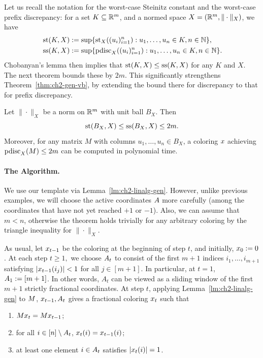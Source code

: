 Let us recall the notation for the worst-case Steinitz constant
and the worst-case prefix discrepancy: for a set \(K
\subseteq \mathbb{R}^m\), and a normed space \(X = (\mathbb{R}^m,\|\cdot\|_X)\), we  have
\begin{align*}
  &\operatorname{st}(K, X) := \sup\{\operatorname{st}_X((u_i)_{i=1}^n): u_1, \ldots, u_n \in K, n \in \mathbb{N}\},\\
  &\operatorname{ss}(K, X) := \sup\{\operatorname{pdisc}_X((u_i)_{i=1}^n): u_1, \ldots, u_n \in K, n \in \mathbb{N}\}.
\end{align*}
Chobanyan's lemma then implies that \(\operatorname{st}(K,X) \le \operatorname{ss}(K,X)\) for any
\(K\) and \(X\). %
The next theorem bounds these by $2m$.
This significantly strengthens Theorem~\ref{thm:ch2-gen-vb}, by extending the bound there for discrepancy to that for prefix discrepancy.

\begin{theorem}\label{thm:ch2-gen-st}
  Let \(\|\cdot\|_X\) be a norm on \(\mathbb{R}^m\) with unit ball
  \(B_X\).
  Then
  \[
    \operatorname{st}(B_X, X) \le \operatorname{ss}(B_X, X) \le 2m.
  \]
  Moreover, for any matrix \(M\) with columns \(u_1, \ldots, u_n \in B_X\), a
  coloring \(x\) achieving \(\operatorname{pdisc}_X(M) \le 2m\) can
  be computed in polynomial time. 
\end{theorem}

\paragraph{The Algorithm.} We use our template via Lemma~\ref{lm:ch2-linalg-gen}. However, unlike previous examples, we will choose the active coordinates \(A\) more carefully (among the coordinates that have not yet reached \(+1\) or \(-1\)). 
Also, we can assume that \(m < n\),
otherwise the theorem holds trivially for any arbitrary coloring by the triangle inequality for \(\|\cdot\|_X\).


As usual, let $x_{t-1}$ be the coloring at the  beginning of step $t$, and 
initially, \(x_0 :=
  0\).  At each step \(t
  \ge 1,\) we choose \(A_{t}\) to consist of the first \(m+1\) indices
  \(i_1, \ldots, i_{m+1}\) satisfying \(|x_{t-1}(i_j)|<1\) for all
  \(j \in [m+1]\). In particular, at $t=1$, \(A_1 := [m+1]\). 
In other words, $A_t$ can be viewed as a sliding window of the first $m+1$ strictly fractional coordinates.  
At step $t$, applying Lemma~\ref{lm:ch2-linalg-gen} to \(M\),
  \(x_{t-1}, A_t \)
  gives a fractional coloring
  \(x_{t}\) such that
  \begin{enumerate}
  \item \(M x_t = M x_{t-1}\);
  \item for all \(i \in [n]\setminus A_{t}\), \(x_t(i) = x_{t-1}(i)\);
  \item at least one element \(i \in A_{t}\) satisfies
    \(|x_t(i)| = 1\).
  \end{enumerate}

